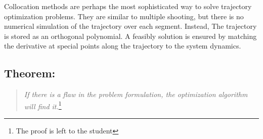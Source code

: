 \par Collocation methods are perhaps the most sophisticated way to solve trajectory optimization problems. They are similar to multiple shooting, but there is no numerical simulation of the trajectory over each segment. Instead, The trajectory is stored as an orthogonal polynomial. A feasibly solution is ensured by matching the derivative at special points along the trajectory to the system dynamics.

\subsection{Theorem: }
\begin{quote}
  {\em If there is a flaw in the problem formulation, the optimization algorithm will find it.}\footnote{The proof is left to the student}\cite{JohnT.Betts2001}
\end{quote}